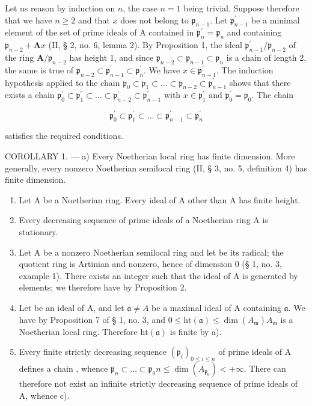 Let us reason by induction on \(n\), the case \(n=1\) being trivial. Suppose therefore that we have \(n\geqslant2\) and that \(x\) does not belong to \(\mathfrak{p}_{n-1}\). Let \(\mathfrak{p}_{n-1}^{\prime}\) be a minimal element of the set of prime ideals of A contained in \(\mathfrak{p}_{n}^{\prime}=\mathfrak{p}_{n}\) and containing \(\mathfrak{p}_{n-2}+\mathbf{A}x\) (II, § 2, no. 6, lemma 2). By Proposition 1, the ideal \(\mathfrak{p}_{n-1}^{\prime}/\mathfrak{p}_{n-2}\) of the ring \(\mathbf{A}/\mathfrak{p}_{n-2}\) has height 1, and since \(\mathfrak{p}_{n-2}\subset\mathfrak{p}_{n-1}\subset\mathfrak{p}_{n}\) is a chain of length 2, the same is true of \(\mathfrak{p}_{n-2}\subset\mathfrak{p}_{n-1}^{\prime}\subset\mathfrak{p}_{n}^{\prime}\). We have \(x\in\mathfrak{p}_{n-1}^{\prime}\). The induction hypothesis applied to the chain \(\mathfrak{p}_{0}\subset\mathfrak{p}_{1}\subset\ldots\subset\mathfrak{p}_{n-2}\subset\mathfrak{p}_{n-1}^{\prime}\) shows that there exists a chain \(\mathfrak{p}_{0}^{\prime}\subset\mathfrak{p}_{1}^{\prime}\subset\ldots\subset\mathfrak{p}_{n-2}^{\prime}\subset\mathfrak{p}_{n-1}^{\prime}\) with \(x\in\mathfrak{p}_{1}^{\prime}\) and \(\mathfrak{p}_{0}^{\prime}=\mathfrak{p}_{0}\). The chain

\[
\mathfrak {p} _ {0} ^ {\prime} \subset \mathfrak {p} _ {1} ^ {\prime} \subset \dots \subset \mathfrak {p} _ {n - 1} ^ {\prime} \subset \mathfrak {p} _ {n} ^ {\prime}
\]

satisfies the required conditions.

COROLLARY 1. --- a) Every Noetherian local ring has finite dimension. More generally, every nonzero Noetherian semilocal ring (II, § 3, no. 5, definition 4) has finite dimension.

\begin{enumerate}
\def\labelenumi{\alph{enumi})}
\setcounter{enumi}{1}
\item
  Let A be a Noetherian ring. Every ideal of A other than A has finite height.
\item
  Every decreasing sequence of prime ideals of a Noetherian ring A is stationary.
\item
  Let A be a nonzero Noetherian semilocal ring and let  be its radical; the quotient ring  is Artinian and nonzero, hence of dimension 0 (§ 1, no. 3, example 1). There exists an integer  such that the ideal  of A is generated by  elements; we therefore have  by Proposition 2.
\item
  Let  be an ideal of A, and let \(\mathfrak{a} \neq A\) be a maximal ideal of A containing \(\mathfrak{a}\). We have  by Proposition 7 of § 1, no. 3, and \(0 \leqslant \mathrm{ht}(\mathfrak{a}) \leqslant \dim(A_{\mathfrak{m}})\)\(A_{\mathfrak{m}}\) is a Noetherian local ring. Therefore \(\mathrm{ht}(\mathfrak{a})\) is finite by a).
\item
  Every finite strictly decreasing sequence \((\mathfrak{p}_{i})_{0\leqslant i\leqslant n}\) of prime ideals of A defines a chain , whence \(\mathfrak p_{n}\subset\ldots\subset\mathfrak p_{0}\)\(n\leqslant\dim(A_{\mathfrak p_{0}})<+\infty\). There can therefore not exist an infinite strictly decreasing sequence of prime ideals of A, whence c).
\end{enumerate}


